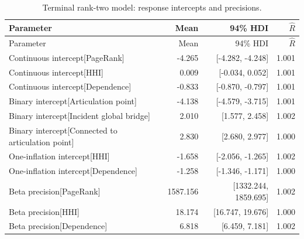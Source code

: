 \documentclass[pdftex,12pt,openright,a4paper,oneside]{book}
\begin{document}
\begin{longtable}{@{}p{}rrr@{}}

\caption{Terminal rank-two model: response intercepts and precisions.}\label{tab:terminal_rank2_69}\\

\toprule

Parameter & Mean & 94\% HDI & $\widehat R$ \\

\midrule\endfirsthead

\toprule

Parameter & Mean & 94\% HDI & $\widehat R$ \\

\midrule\endhead

Continuous intercept[PageRank] & -4.265 & [-4.282, -4.248] & 1.001 \\

Continuous intercept[HHI] & 0.009 & [-0.034, 0.052] & 1.001 \\

Continuous intercept[Dependence] & -0.833 & [-0.870, -0.797] & 1.001 \\

Binary intercept[Articulation point] & -4.138 & [-4.579, -3.715] & 1.001 \\

Binary intercept[Incident global bridge] & 2.010 & [1.577, 2.458] & 1.002 \\

Binary intercept[Connected to articulation point] & 2.830 & [2.680, 2.977] & 1.000 \\

One-inflation intercept[HHI] & -1.658 & [-2.056, -1.265] & 1.002 \\

One-inflation intercept[Dependence] & -1.258 & [-1.346, -1.171] & 1.000 \\

Beta precision[PageRank] & 1587.156 & [1332.244, 1859.695] & 1.002 \\

Beta precision[HHI] & 18.174 & [16.747, 19.676] & 1.000 \\

Beta precision[Dependence] & 6.818 & [6.459, 7.181] & 1.002 \\

\bottomrule\end{longtable}
\end{document}
